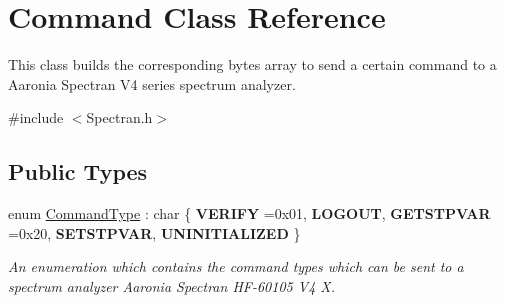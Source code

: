 \hypertarget{classCommand}{}\section{Command Class Reference}
\label{classCommand}


This class builds the corresponding bytes array to send a certain command to a Aaronia Spectran V4 series spectrum analyzer.  




{\ttfamily \#include $<$Spectran.\+h$>$}

\subsection*{Public Types}
\begin{DoxyCompactItemize}
\item 
enum \hyperlink{classCommand_a658ae4be30c6dd9b673e467908acaeb5}{Command\+Type} \+: char \{ \newline
{\bfseries V\+E\+R\+I\+FY} =0x01, 
{\bfseries L\+O\+G\+O\+UT}, 
{\bfseries G\+E\+T\+S\+T\+P\+V\+AR} =0x20, 
{\bfseries S\+E\+T\+S\+T\+P\+V\+AR}, 
\newline
{\bfseries U\+N\+I\+N\+I\+T\+I\+A\+L\+I\+Z\+ED}
 \}\begin{DoxyCompactList}\small\item\em An enumeration which contains the command types which can be sent to a spectrum analyzer Aaronia Spectran H\+F-\/60105 V4 X. \end{DoxyCompactList}
\end{DoxyCompactItemize}
